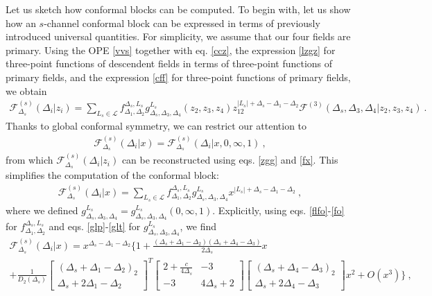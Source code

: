 \documentclass[12pt,a4paper,notitlepage]{report}
\numberwithin{equation}{section}
\theoremstyle{break}
\begin{document}
Let us sketch how conformal blocks can be computed. 
To begin with, let us show how an $s$-channel conformal block can be expressed in terms of previously introduced universal quantities.
For simplicity, we assume that our four fields are primary.
Using the OPE \eqref{vvs} together with eq. \eqref{ccz}, the expression \eqref{lzgz} for three-point functions of descendent fields in terms of three-point functions of primary fields, and the expression \eqref{cff} for three-point functions of primary fields, we obtain
\begin{align}
 \mathcal{F}^{(s)}_{\Delta_s}(\Delta_i|z_i) = \sum_{L_s\in\mathcal{L}} f_{\Delta_1,\Delta_2}^{\Delta_s,L_s} g^{L_s}_{\Delta_s,\Delta_3,\Delta_4}(z_2,z_3,z_4)z_{12}^{|L_s|+\Delta_s-\Delta_1-\Delta_2}\mathcal{F}^{(3)}(\Delta_s,\Delta_3,\Delta_4|z_2,z_3,z_4)\ .
\end{align}
Thanks to global conformal symmetry, we can restrict our attention to 
\begin{align}
 \mathcal{F}^{(s)}_{\Delta_s}(\Delta_i|x)=\mathcal{F}^{(s)}_{\Delta_s}(\Delta_i|x,0,\infty,1)\ ,
\end{align}
from which $\mathcal{F}^{(s)}_{\Delta_s}(\Delta_i|z_i)$ can be reconstructed using eqs. \eqref{zgg} and \eqref{fx}.
This simplifies the computation of the conformal block:
\begin{align}
 \mathcal{F}^{(s)}_{\Delta_s}(\Delta_i|x) = \sum_{L_s\in\mathcal{L}} f_{\Delta_1,\Delta_2}^{\Delta_s,L_s} g^{L_s}_{\Delta_s,\Delta_3,\Delta_4}x^{|L_s|+\Delta_s-\Delta_1-\Delta_2}\ ,
\label{gsd}
\end{align}
where we defined $g^{L_s}_{\Delta_s,\Delta_3,\Delta_4} = g^{L_s}_{\Delta_s,\Delta_3,\Delta_4}(0,\infty,1)$.
Explicitly, using eqs. \eqref{flfo}-\eqref{fo} for $f_{\Delta_1,\Delta_2}^{\Delta_s,L_s}$ and eqs. \eqref{glp}-\eqref{glt} for $g^{L_s}_{\Delta_s,\Delta_3,\Delta_4}$, we find 
\begin{multline}
 \mathcal{F}^{(s)}_{\Delta_s}(\Delta_i|x) 
= x^{\Delta_s - \Delta_1 - \Delta_2}\Bigg\{ 1 
+ \frac{(\Delta_s+\Delta_1-\Delta_2)(\Delta_s+\Delta_4-\Delta_3)}{2\Delta_s} x  
\\
+ \frac{1}{D_2(\Delta_s)}
\begin{bmatrix} (\Delta_s+\Delta_1-\Delta_2)_2 \\ \Delta_s+2\Delta_1-\Delta_2 \end{bmatrix}^T
\begin{bmatrix} 2+\frac{c}{4\Delta_s} & -3 \\ -3 & 4\Delta_s+2 \end{bmatrix}
\begin{bmatrix} (\Delta_s+\Delta_4-\Delta_3)_2 \\ \Delta_s+2\Delta_4-\Delta_3 \end{bmatrix}
 x^2 + O(x^3)\Bigg\}\ ,
\end{multline}
\end{document}
